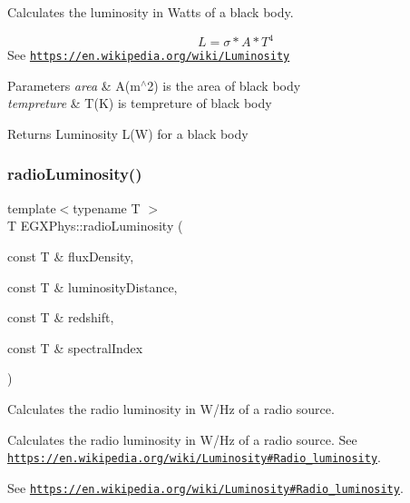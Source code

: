 Calculates the luminosity in Watts of a black body. 

\[L=\sigma*A*T^4\] See \href{https://en.wikipedia.org/wiki/Luminosity}{\tt https\+://en.\+wikipedia.\+org/wiki/\+Luminosity}


\begin{DoxyParams}{Parameters}
{\em area} & A(m$^\wedge$2) is the area of black body \\
\hline
{\em tempreture} & T(\+K) is tempreture of black body \\
\hline
\end{DoxyParams}
\begin{DoxyReturn}{Returns}
Luminosity L(\+W) for a black body 
\end{DoxyReturn}
\mbox{\label{group___astrophysics_ga6d6865b2aac1bc7c7f06b7c4ac2444e4}} 
\subsubsection{\texorpdfstring{radio\+Luminosity()}{radioLuminosity()}}
{\footnotesize\ttfamily template$<$typename T $>$ \\
T E\+G\+X\+Phys\+::radio\+Luminosity (\begin{DoxyParamCaption}\item[{const T \&}]{flux\+Density,  }\item[{const T \&}]{luminosity\+Distance,  }\item[{const T \&}]{redshift,  }\item[{const T \&}]{spectral\+Index }\end{DoxyParamCaption})}



Calculates the radio luminosity in W/\+Hz of a radio source. 

Calculates the radio luminosity in W/\+Hz of a radio source. See \href{https://en.wikipedia.org/wiki/Luminosity#Radio_luminosity}{\tt https\+://en.\+wikipedia.\+org/wiki/\+Luminosity\#\+Radio\+\_\+luminosity}.

See \href{https://en.wikipedia.org/wiki/Luminosity#Radio_luminosity}{\tt https\+://en.\+wikipedia.\+org/wiki/\+Luminosity\#\+Radio\+\_\+luminosity}.


